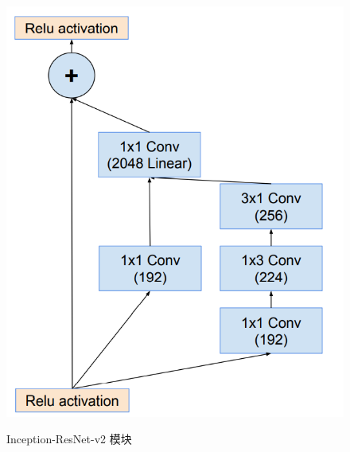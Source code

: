 \begin{figure}[htbp]
{\begin{minipage}{0.30\linewidth}
			\includegraphics[width = \linewidth]{readings_figures/Inception_ResNet_v2_8grid.png}
			\label{fig:Inception_ResNet_v2_8grid}
		\end{minipage}
	}
	\centering
	\centering
	\caption{Inception-ResNet-v2 模块}
	\label{fig:Inception_ResNet_v2_module}
\end{figure}

